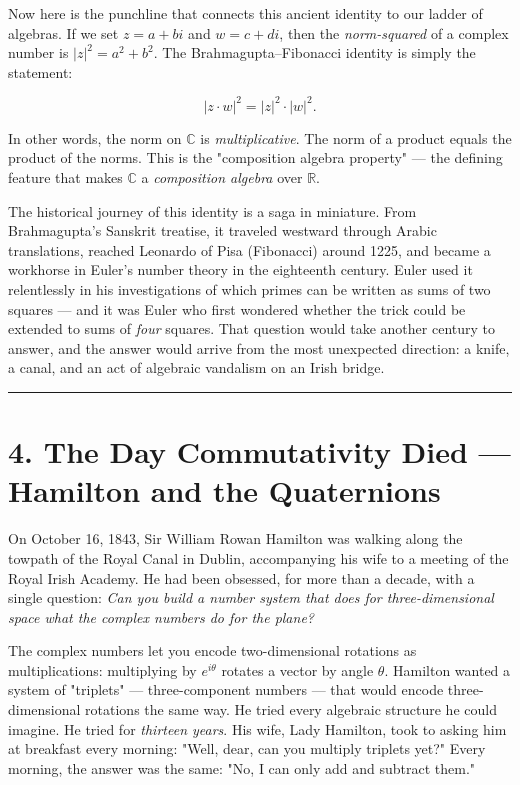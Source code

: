 \documentclass[11pt,openany]{book}
\theoremstyle{definition}
\theoremstyle{plain}
\theoremstyle{remark}
\begin{document}
Now here is the punchline that connects this ancient identity to our ladder of algebras. If we set $z = a + bi$ and $w = c + di$, then the \textit{norm-squared} of a complex number is $|z|^2 = a^2 + b^2$. The Brahmagupta–Fibonacci identity is simply the statement:

$$|z \cdot w|^2 = |z|^2 \cdot |w|^2.$$

In other words, the norm on $\mathbb{C}$ is \textit{multiplicative}. The norm of a product equals the product of the norms. This is the "composition algebra property" — the defining feature that makes $\mathbb{C}$ a \textit{composition algebra} over $\mathbb{R}$.

The historical journey of this identity is a saga in miniature. From Brahmagupta's Sanskrit treatise, it traveled westward through Arabic translations, reached Leonardo of Pisa (Fibonacci) around 1225, and became a workhorse in Euler's number theory in the eighteenth century. Euler used it relentlessly in his investigations of which primes can be written as sums of two squares — and it was Euler who first wondered whether the trick could be extended to sums of \textit{four} squares. That question would take another century to answer, and the answer would arrive from the most unexpected direction: a knife, a canal, and an act of algebraic vandalism on an Irish bridge.

\bigskip\noindent\rule{\textwidth}{0.4pt}\bigskip


\section{4. The Day Commutativity Died — Hamilton and the Quaternions}


On October 16, 1843, Sir William Rowan Hamilton was walking along the towpath of the Royal Canal in Dublin, accompanying his wife to a meeting of the Royal Irish Academy. He had been obsessed, for more than a decade, with a single question: \textit{Can you build a number system that does for three-dimensional space what the complex numbers do for the plane?}

The complex numbers let you encode two-dimensional rotations as multiplications: multiplying by $e^{i\theta}$ rotates a vector by angle $\theta$. Hamilton wanted a system of "triplets" — three-component numbers — that would encode three-dimensional rotations the same way. He tried every algebraic structure he could imagine. He tried for \textit{thirteen years}. His wife, Lady Hamilton, took to asking him at breakfast every morning: "Well, dear, can you multiply triplets yet?" Every morning, the answer was the same: "No, I can only add and subtract them."
\end{document}
